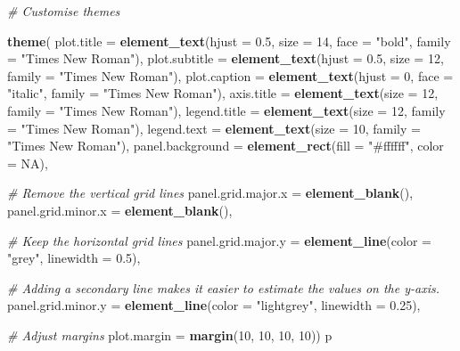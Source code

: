 \documentclass[
]{article}
\newenvironment{Shaded}{\begin{snugshade}}{\end{snugshade}}
\newcommand{\AttributeTok}[1]{\textcolor[rgb]{0.13,0.29,0.53}{#1}}
\newcommand{\CommentTok}[1]{\textcolor[rgb]{0.56,0.35,0.01}{\textit{#1}}}
\newcommand{\ConstantTok}[1]{\textcolor[rgb]{0.56,0.35,0.01}{#1}}
\newcommand{\DecValTok}[1]{\textcolor[rgb]{0.00,0.00,0.81}{#1}}
\newcommand{\FloatTok}[1]{\textcolor[rgb]{0.00,0.00,0.81}{#1}}
\newcommand{\FunctionTok}[1]{\textcolor[rgb]{0.13,0.29,0.53}{\textbf{#1}}}
\newcommand{\NormalTok}[1]{#1}
\newcommand{\StringTok}[1]{\textcolor[rgb]{0.31,0.60,0.02}{#1}}
\begin{document}
\begin{Shaded}
\begin{Highlighting}[]
  \CommentTok{\# Customise themes}
  
  \FunctionTok{theme}\NormalTok{(}
    \AttributeTok{plot.title =} \FunctionTok{element\_text}\NormalTok{(}\AttributeTok{hjust =} \FloatTok{0.5}\NormalTok{, }\AttributeTok{size =} \DecValTok{14}\NormalTok{, }\AttributeTok{face =} \StringTok{"bold"}\NormalTok{, }\AttributeTok{family =} \StringTok{"Times New Roman"}\NormalTok{),}
    \AttributeTok{plot.subtitle =} \FunctionTok{element\_text}\NormalTok{(}\AttributeTok{hjust =} \FloatTok{0.5}\NormalTok{, }\AttributeTok{size =} \DecValTok{12}\NormalTok{, }\AttributeTok{family =} \StringTok{"Times New Roman"}\NormalTok{),}
    \AttributeTok{plot.caption =} \FunctionTok{element\_text}\NormalTok{(}\AttributeTok{hjust =} \DecValTok{0}\NormalTok{, }\AttributeTok{face =} \StringTok{"italic"}\NormalTok{, }\AttributeTok{family =} \StringTok{"Times New Roman"}\NormalTok{),}
    \AttributeTok{axis.title =} \FunctionTok{element\_text}\NormalTok{(}\AttributeTok{size =} \DecValTok{12}\NormalTok{, }\AttributeTok{family =} \StringTok{"Times New Roman"}\NormalTok{),}
    \AttributeTok{legend.title =} \FunctionTok{element\_text}\NormalTok{(}\AttributeTok{size =} \DecValTok{12}\NormalTok{, }\AttributeTok{family =} \StringTok{"Times New Roman"}\NormalTok{),}
    \AttributeTok{legend.text =} \FunctionTok{element\_text}\NormalTok{(}\AttributeTok{size =} \DecValTok{10}\NormalTok{, }\AttributeTok{family =} \StringTok{"Times New Roman"}\NormalTok{),}
    \AttributeTok{panel.background =} \FunctionTok{element\_rect}\NormalTok{(}\AttributeTok{fill =} \StringTok{"\#ffffff"}\NormalTok{, }\AttributeTok{color =} \ConstantTok{NA}\NormalTok{),}
    
    \CommentTok{\# Remove the vertical grid lines}
    \AttributeTok{panel.grid.major.x =} \FunctionTok{element\_blank}\NormalTok{(),}
    \AttributeTok{panel.grid.minor.x =} \FunctionTok{element\_blank}\NormalTok{(),}
    
    \CommentTok{\# Keep the horizontal grid lines}
    \AttributeTok{panel.grid.major.y =} \FunctionTok{element\_line}\NormalTok{(}\AttributeTok{color =} \StringTok{"grey"}\NormalTok{, }\AttributeTok{linewidth =} \FloatTok{0.5}\NormalTok{),}
    
    \CommentTok{\# Adding a secondary line makes it easier to estimate the values on the y{-}axis. }
    \AttributeTok{panel.grid.minor.y =} \FunctionTok{element\_line}\NormalTok{(}\AttributeTok{color =} \StringTok{"lightgrey"}\NormalTok{, }\AttributeTok{linewidth =} \FloatTok{0.25}\NormalTok{),}
   
     \CommentTok{\# Adjust margins}
    \AttributeTok{plot.margin =} \FunctionTok{margin}\NormalTok{(}\DecValTok{10}\NormalTok{, }\DecValTok{10}\NormalTok{, }\DecValTok{10}\NormalTok{, }\DecValTok{10}\NormalTok{))}
\NormalTok{p}
\end{Highlighting}
\end{Shaded}
\end{document}
